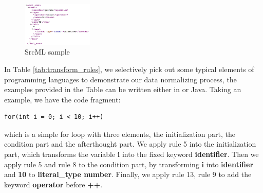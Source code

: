 \begin{figure}[t!]
	
	\includegraphics[width=0.3\textwidth]{srcml_sample}
	\caption{SrcML sample}
	\label{fig:srcml_sample}
\end{figure}

In Table \ref{tab:transform_rules}, we selectively pick out some typical elements of programming languages to demonstrate our data normalizing process, the examples provided in the Table can be written either in  or Java. Taking an example, we have the code fragment: 

\begin{lstlisting}
for(int i = 0; i < 10; i++)
\end{lstlisting}

which is a simple for loop with three elements, the initialization part, the condition part and the afterthought part. We apply rule 5 into the initialization part, which transforms the variable \textbf{i} into the fixed keyword \textbf{identifier}. Then we apply rule 5 and rule 8 to the condition part, by transforming \textbf{i} into \textbf{identifier} and \textbf{10} to \textbf{literal\_type number}. Finally, we apply rule 13, rule 9 to add the keyword \textbf{operator} before \textbf{++}. 

